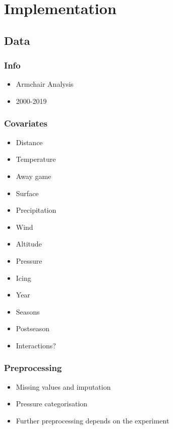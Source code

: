 \chapter{Implementation}

\section{Data}
\subsection{Info}
\begin{itemize}
    \item Armchair Analysis
    \item 2000-2019
\end{itemize}
\subsection{Covariates}
\begin{itemize}
    \item Distance
    \item Temperature
    \item Away game
    \item Surface
    \item Precipitation
    \item Wind
    \item Altitude
    \item Pressure
    \item Icing
    \item Year
    \item Seasons
    \item Postseason
    \item Interactions?
\end{itemize}
\subsection{Preprocessing}
\begin{itemize}
    \item Missing values and imputation
    \item Pressure categorisation
    \item Further preprocessing depends on the experiment
\end{itemize}

